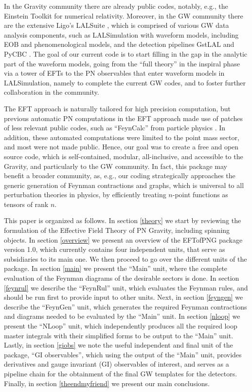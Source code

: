 \documentclass[a4paper,11pt]{article}
\begin{document}
In the Gravity community there are already public codes, notably, e.g., the Einstein Toolkit 
\cite{EinsTK} for numerical relativity. Moreover, in the GW community there are the 
extensive Ligo's LALSuite \cite{LigoDA}, which is comprised of various GW data analysis 
components, such as LALSimulation with waveform models, including EOB and phenomenological 
models, and the detection pipelines GstLAL \cite{LigoDA} and PyCBC \cite{pycbc}. The goal of 
our current code is to start filling in the gap in the analytic part of the waveform models, 
going from the ``full theory'' in the inspiral phase via a tower of EFTs to the PN 
observables that enter waveform models in LALSimulation, namely to complete the current GW 
codes, and to foster further collaboration in the community.

The EFT approach is naturally tailored for high precision computation, but 
previous automatic PN computations in the EFT approach made use of patches of less relevant 
public codes, such as ``FeynCalc'' from particle physics \cite{Chu:2008xm,Foffa:2011ub}. In 
addition, these automated computations were limited to the point mass sector, and most were 
not made public. Hence, our goal was to create a free and open source code, which is 
self-contained, modular, all-inclusive, and accessible to the Gravity, and particularly to 
the GW community. In fact, this package may benefit a broader community, as, 
e.g., our coding strategically approaches the generic generation of Feynman contractions and 
graphs, which is universal to all perturbation theories in physics, by efficiently treating 
$n$-point functions as tensors of rank $n$.

This paper is organized as follows.
In section \ref{theory} we start by reviewing the formulation of the Effective Field Theory 
of PN Gravity, including spinning objects. In section \ref{overview} we present an overview 
of the EFTofPNG package version 1.0, which currently contains four independent units, that 
serve as subsidiaries to its main one. We then proceed to go over the different units of the 
package. In section \ref{main} we present the ``Main'' unit, where the complete evaluation 
of the Feynman diagrams of the desirable sectors is done. In section \ref{feynrul} we 
describe the ``FeynRul'' unit, which evaluates the Feynman rules, and should be run first to 
provide input to other units. Next, in section \ref{feyngen} we describe the ``FeynGen'' 
unit, which generates the required Feynman contractions and diagrams needed to be evaluated 
by the ``Main'' unit. In section \ref{nloop} we present the ``NLoop'' unit, which 
independently produces all the required loop master integrals with their simplified forms to 
be output to the ``Main'' unit. Lastly, in section \ref{giobs} we note the useful 
independent and final unit of the package, ``GI observables'', which using the output of the 
``Main'' unit, provides derivatives and gauge invariant (GI) observables of interest, and 
serves as a pipeline chain for the obtainment of the final GW templates for the detectors. 
Finally, in section \ref{theendmyfriend} we present our main conclusions.  
\end{document}
